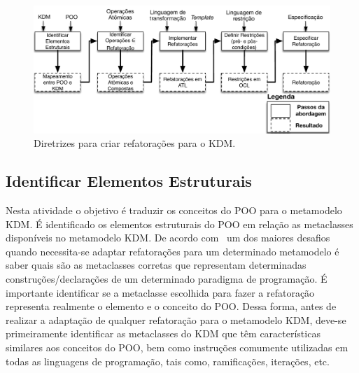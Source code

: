 \begin{figure}[h]
	\centering
	\caption{Diretrizes para criar refatorações para o KDM.}
	\label{fig:todos_os_passos_diretrizes}
	\includegraphics[scale=0.7]{images/novaImagemAbordagemCriarRefatoracao}
	\fautor
\end{figure}

\subsection{Identificar Elementos Estruturais}\label{sec:mapeamento_POO_e_KDM}

Nesta atividade o objetivo é traduzir os conceitos do POO para o metamodelo KDM. É identificado os elementos estruturais do POO em relação as metaclasses disponíveis no metamodelo KDM. De acordo com~ um dos maiores desafios quando necessita-se adaptar refatorações para um determinado metamodelo é saber quais são as metaclasses corretas que representam determinadas construções/declarações de um determinado paradigma de programação. É importante identificar se a metaclasse escolhida para fazer a refatoração representa realmente o elemento e o conceito do POO. Dessa forma, antes de realizar a adaptação de qualquer refatoração para o metamodelo KDM, deve-se primeiramente identificar as metaclasses do KDM que têm características similares aos conceitos do POO, bem como instruções comumente utilizadas em todas as linguagens de programação, tais como, ramificações, iterações, etc. 


